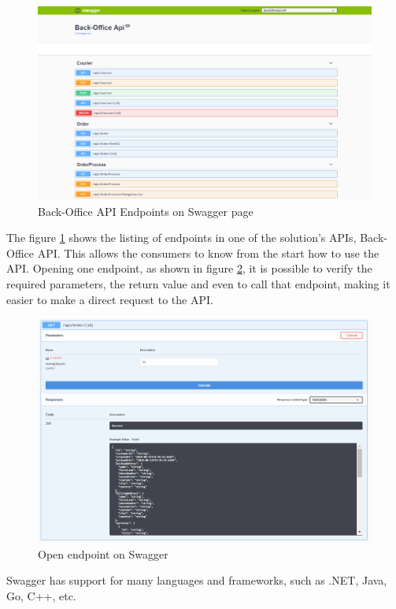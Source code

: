 \begin{figure}[ht]
\centering
\includegraphics[width=\textwidth,keepaspectratio]{chapters/State_of_the_Art/assets/backoffice-api-endpoints.PNG}
\caption[Back-Office API Endpoints on Swagger page]{Back-Office API Endpoints on Swagger page}
\label{fig:swaggerEndpoints}
\end{figure}

\par
The figure \ref{fig:swaggerEndpoints} shows the listing of endpoints in one of the solution's \glspl{API}, Back-Office API. This allows the consumers to know from the start how to use the \gls{API}. Opening one endpoint, as shown in figure \ref{fig:endpointExample}, it is possible to verify the required parameters, the return value and even to call that endpoint, making it easier to make a direct request to the \gls{API}.

\begin{figure}[!hb]
\centering
\includegraphics[width=\textwidth,keepaspectratio]{chapters/State_of_the_Art/assets/open-endpoint.PNG}
\caption[Open endpoint on Swagger]{Open endpoint on Swagger}
\label{fig:endpointExample}
\end{figure}

\par

Swagger has support for many languages and frameworks, such as .NET, Java, Go, C++, etc.
